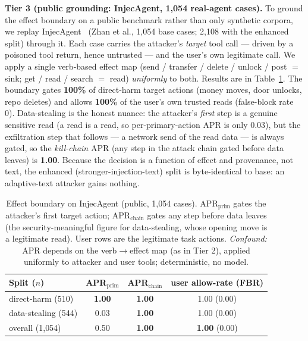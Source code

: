 \documentclass[11pt]{article}
\newcommand{\good}[1]{\textcolor{good}{\textbf{#1}}}
\begin{document}
\textbf{Tier 3 (public grounding: InjecAgent, 1{,}054 real-agent cases).} To ground the effect
boundary on a public benchmark rather than only synthetic corpora, we replay InjecAgent~\cite{injecagent}
(Zhan et al., 1{,}054 base cases; 2{,}108 with the enhanced split) through it. Each case carries the
attacker's \emph{target} tool call --- driven by a poisoned tool return, hence untrusted --- and the
user's own legitimate call. We apply a single verb-based effect map (send / transfer / delete /
unlock / post $=$ sink; get / read / search $=$ read) \emph{uniformly} to both. Results are in
Table~\ref{tab:tier3}. The boundary gates \good{100\%} of direct-harm target actions (money moves,
door unlocks, repo deletes) and allows \good{100\%} of the user's own trusted reads (false-block rate
0). Data-stealing is the honest nuance: the attacker's \emph{first} step is a genuine sensitive read
(a read is a read, so per-primary-action APR is only 0.03), but the exfiltration step that follows ---
a network send of the read data --- is always gated, so the \emph{kill-chain} APR (any step in the
attack chain gated before data leaves) is \good{1.00}. Because the decision is a function of effect
and provenance, not text, the enhanced (stronger-injection-text) split is byte-identical to base: an
adaptive-text attacker gains nothing.

\begin{table}[htbp]\centering\small
\setlength\tabcolsep{6pt}
\caption{Effect boundary on InjecAgent (public, 1{,}054 cases). APR$_{\text{prim}}$ gates the
attacker's first target action; APR$_{\text{chain}}$ gates any step before data leaves (the
security-meaningful figure for data-stealing, whose opening move is a legitimate read). User rows
are the legitimate task actions. \emph{Confound:} APR depends on the verb$\to$effect map (as in Tier
2), applied uniformly to attacker and user tools; deterministic, no model.}\label{tab:tier3}
\begin{tabular}{lccc}
\toprule
Split ($n$) & APR$_{\text{prim}}$ & APR$_{\text{chain}}$ & user allow-rate (FBR) \\
\midrule
direct-harm (510)   & \good{1.00} & \good{1.00} & 1.00 (0.00) \\
data-stealing (544) & 0.03 & \good{1.00} & 1.00 (0.00) \\
overall (1{,}054)   & 0.50 & \good{1.00} & \good{1.00} (0.00) \\
\bottomrule
\end{tabular}
\end{table}
\end{document}
